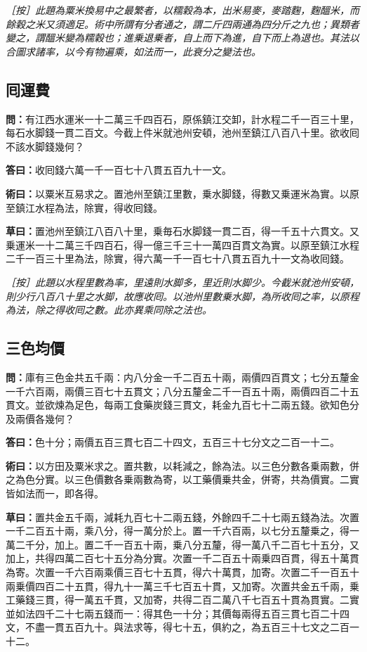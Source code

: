 \documentclass[11pt,a4paper]{article}
\newcommand{\Question}[1]{\par\noindent\textbf{\color{problemcolor}問：}#1\par}
\newcommand{\Answer}[1]{\par\noindent\textbf{\color{answercolor}答曰：}#1\par}
\newcommand{\Method}[1]{\par\noindent\textbf{\color{methodcolor}術曰：}#1\par}
\newcommand{\Working}[1]{\par\noindent\textbf{草曰：}#1\par}
\newcommand{\EditorialNote}[1]{\par\noindent\textit{［按］#1}\par}
\begin{document}
\EditorialNote{此題為粟米換易中之最繁者，以糯穀為本，出米易麥，麥踏麴，麴醞米，而餘穀之米又須適足。術中所謂有分者通之，謂二斤四兩通為四分斤之九也；異類者變之，謂醞米變為糯穀也；進乗退乗者，自上而下為進，自下而上為退也。其法以合圖求諸率，以今有物遍乘，如法而一，此衰分之變法也。}

\subsection*{\color{sectioncolor}囘運費}

\Question{有江西水運米一十二萬三千四百石，原係鎮江交卸，計水程二千一百三十里，每石水脚錢一貫二百文。今截上件米就池州安頓，池州至鎮江八百八十里。欲收囘不該水脚錢幾何？}

\Answer{收囘錢六萬一千一百七十八貫五百九十一文。}

\Method{以粟米互易求之。置池州至鎮江里數，乗水脚錢，得數又乗運米為實。以原至鎮江水程為法，除實，得收囘錢。}

\Working{置池州至鎮江八百八十里，乗毎石水脚錢一貫二百，得一千五十六貫文。又乗運米一十二萬三千四百石，得一億三千三十一萬四百貫文為實。以原至鎮江水程二千一百三十里為法，除實，得六萬一千一百七十八貫五百九十一文為收囘錢。}

\EditorialNote{此題以水程里數為率，里遠則水脚多，里近則水脚少。今截米就池州安頓，則少行八百八十里之水脚，故應收囘。以池州里數乗水脚，為所收囘之率，以原程為法，除之得收囘之數。此亦異乘同除之法也。}

\subsection*{\color{sectioncolor}三色均價}

\Question{庫有三色金共五千兩：内八分金一千二百五十兩，兩價四百貫文；七分五釐金一千六百兩，兩價三百七十五貫文；八分五釐金二千一百五十兩，兩價四百二十五貫文。並欲煉為足色，每兩工食藥炭錢三貫文，耗金九百七十二兩五錢。欲知色分及兩價各幾何？}

\Answer{色十分；兩價五百三貫七百二十四文，五百三十七分文之二百一十二。}

\Method{以方田及粟米求之。置共數，以耗減之，餘為法。以三色分數各乗兩數，併之為色分實。以三色價數各乗兩數為寄，以工藥價乗共金，併寄，共為價實。二實皆如法而一，即各得。}

\Working{置共金五千兩，減耗九百七十二兩五錢，外餘四千二十七兩五錢為法。次置一千二百五十兩，乘八分，得一萬分於上。置一千六百兩，以七分五釐乗之，得一萬二千分，加上。置二千一百五十兩，乗八分五釐，得一萬八千二百七十五分，又加上，共得四萬二百七十五分為分實。次置一千二百五十兩乗四百貫，得五十萬貫為寄。次置一千六百兩乘價三百七十五貫，得六十萬貫，加寄。次置二千一百五十兩乗價四百二十五貫，得九十一萬三千七百五十貫，又加寄。次置共金五千兩，乗工藥錢三貫，得一萬五千貫，又加寄，共得二百二萬八千七百五十貫為貫實。二實並如法四千二十七兩五錢而一：得其色一十分；其價每兩得五百三貫七百二十四文，不盡一貫五百九十。與法求等，得七十五，俱約之，為五百三十七文之二百一十二。}
\end{document}
